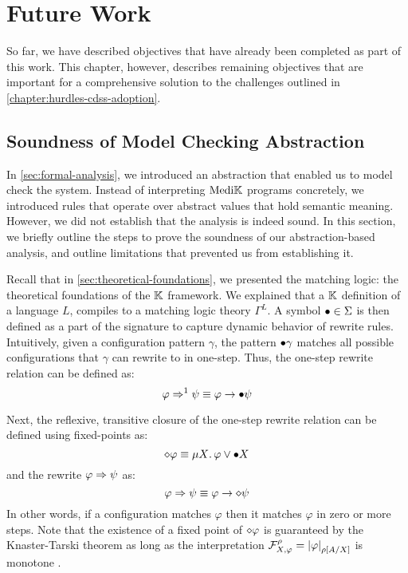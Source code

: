 \chapter{Future Work}\label{chapter:future-work}

So far, we have described objectives that have already been completed
as part of this work. This chapter, however, describes remaining
objectives that are important for a comprehensive solution to the
challenges outlined in \autoref{chapter:hurdles-cdss-adoption}.

\section{Soundness of Model Checking Abstraction}\label{sec:abstraction-soundness}

In \autoref{sec:formal-analysis}, we introduced an abstraction that enabled us
to model check the system. Instead of interpreting $\text{Medi}\mathbb{K}{}{}$ programs
concretely, we introduced rules that operate over abstract values
that hold semantic meaning. However, we did not establish that the analysis is
indeed sound. In this section, we briefly outline the steps to prove the
soundness of our abstraction-based analysis, and outline limitations that
prevented us from establishing it.

Recall that in \autoref{sec:theoretical-foundations}, we presented the
matching logic: the theoretical foundations of the $\mathbb{K}$ framework. We explained
that a $\mathbb{K}$ definition of a language $L$, compiles to a matching logic theory
$\Gamma^L$. A symbol ${\bullet} \in \Sigma$ is then defined as a part of the
signature to capture dynamic behavior of rewrite rules.
Intuitively, given a configuration
pattern $\gamma$, the pattern ${\bullet} \gamma$ matches all possible
configurations that $\gamma$ can rewrite to in one-step. Thus,
the one-step rewrite relation can be defined as:
$$
  \varphi \Rightarrow^1 \psi \equiv \varphi \to {\bullet} \psi
$$

Next, the reflexive, transitive closure of the one-step rewrite relation
can be defined using fixed-points as:
$$
  \diamond \varphi \equiv \mu X \mathord{.\,} \varphi \vee {\bullet} X
$$
and the rewrite $\varphi \Rightarrow \psi$ as:
$$
  \varphi \Rightarrow \psi \equiv \varphi \to \diamond \psi
$$
In other words, if a configuration matches
$\varphi$ then it matches $\varphi$ in zero or more steps.
Note that the existence of a fixed point of $\diamond\varphi$
is guaranteed by the Knaster-Tarski theorem as long as the interpretation
$\mathcal{F}^{\rho}_{X,\varphi} = \left|\varphi\right|_{\rho\left[A / X\right]}$
is monotone \cite{ChenLICS19}.

